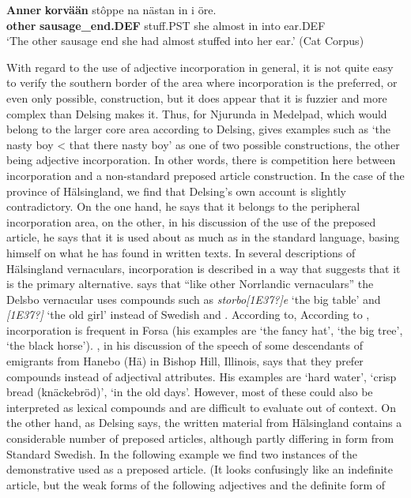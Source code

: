 \ea\label{}
\gll \textbf{Anner}\textbf{  korvään} stôppe  na  nästan  in  i  öre.\\
\textbf{other} \textbf{sausage\_end.DEF} stuff.PST  she  almost  in  into  ear.DEF\\
\glt ‘The other sausage end she had almost stuffed into her ear.’ (Cat Corpus)
\z

With regard to the use of adjective incorporation in general, it is not quite easy to verify the southern border of the area where incorporation is the preferred, or even only possible, construction, but it does appear that it is fuzzier and more complex than Delsing makes it. Thus, for Njurunda in Medelpad, which would belong to the larger core area according to Delsing, \citet[59]{Stenbom1916} gives examples such as  ‘the nasty boy {\textless} that there nasty boy’ as one of two possible constructions, the other being adjective incorporation. In other words, there is competition here between incorporation and a non-standard preposed article construction. In the case of the province of Hälsingland, we find that Delsing’s own account is slightly contradictory. On the one hand, he says that it belongs to the peripheral incorporation area, on the other, in his discussion of the use of the preposed article, he says that it is used about as much as in the standard language, basing himself on what he has found in written texts. In several descriptions of Hälsingland vernaculars, incorporation is described in a way that suggests that it is the primary alternative. \citet[82]{Hjelmström1896} says that “like other Norrlandic vernaculars” the Delsbo vernacular uses compounds such as \textit{storbo[1E37?]e} ‘the big table’ and \textit{[1E37?]} ‘the old girl’ instead of Swedish  and . According to, According to \citet[31]{Franck1995}, incorporation is frequent in Forsa (his examples are ‘the fancy hat’, ‘the big tree’,  ‘the black horse’). \citet[62]{Hedblom1978}, in his discussion of the speech of some descendants of emigrants from Hanebo (Hä) in Bishop Hill, Illinois, says that they prefer compounds instead of adjectival attributes. His examples are  ‘hard water’,  ‘crisp bread (knäckebröd)’,  ‘in the old days’. However, most of these could also be interpreted as lexical compounds and are difficult to evaluate out of context. On the other hand, as Delsing says, the written material from Hälsingland contains a considerable number of preposed articles, although partly differing in form from Standard Swedish. In the following example we find two instances of the demonstrative  used as a preposed article. (It looks confusingly like an indefinite article, but the weak forms of the following adjectives and the definite form of 